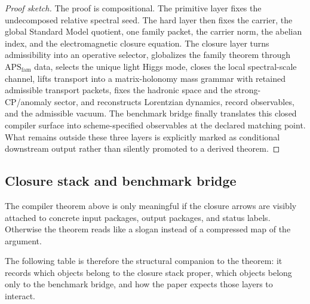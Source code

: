 \documentclass[11pt,a4paper]{article}
\theoremstyle{definition}
\theoremstyle{remark}
\newcommand{\APSfam}{\mathrm{APS}_{\mathrm{fam}}}
\begin{document}
\begin{proof}[Proof sketch]
The proof is compositional. The primitive layer fixes the undecomposed relative spectral seed. The hard layer then fixes the carrier, the global Standard Model quotient, one family packet, the carrier norm, the abelian index, and the electromagnetic closure equation. The closure layer turns admissibility into an operative selector, globalizes the family theorem through $\APSfam$ data, selects the unique light Higgs mode, closes the local spectral-scale channel, lifts transport into a matrix-holonomy mass grammar with retained admissible transport packets, fixes the hadronic space and the strong-CP/anomaly sector, and reconstructs Lorentzian dynamics, record observables, and the admissible vacuum. The benchmark bridge finally translates this closed compiler surface into scheme-specified observables at the declared matching point. What remains outside these three layers is explicitly marked as conditional downstream output rather than silently promoted to a derived theorem.
\end{proof}

\subsection{Closure stack and benchmark bridge}

The compiler theorem above is only meaningful if the closure arrows are visibly attached to concrete input packages, output packages, and status labels. Otherwise the theorem reads like a slogan instead of a compressed map of the argument.

The following table is therefore the structural companion to the theorem: it records which objects belong to the closure stack proper, which objects belong only to the benchmark bridge, and how the paper expects those layers to interact.
\end{document}
